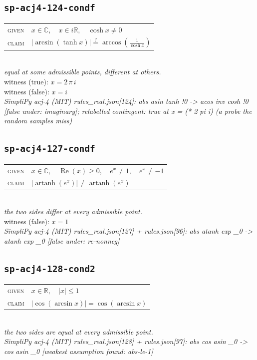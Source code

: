 \documentclass[11pt]{article}
\begin{document}
\subsection*{\texttt{sp-acj4-124-condf}}
\begin{tabular}{@{}l@{\quad}l@{}}
\textsc{given} & $x \in \mathbb{C},\quad x \in i\mathbb{R},\quad \cosh x \neq 0$ \\[4pt]
\textsc{claim} & $\displaystyle \left|\arcsin\left(\tanh x\right)\right| \overset{?}{=} \arccos\left(\frac{1}{\cosh x}\right)$ \\
\end{tabular}\\[2pt]
{\small\emph{equal at some admissible points, different at others.}}\\
{\footnotesize\color{gray}witness (true): $x = 2 \, \pi \, i$}\\
{\footnotesize\color{gray}witness (false): $x = i$}\\
\emph{SimpliPy acj-4 (MIT) rules\_real.json[124]: abs asin tanh !0  ->  acos inv cosh !0  [false under: imaginary]; relabelled contingent: true at x = (* 2 pi i) (a probe the random samples miss)}\\

\subsection*{\texttt{sp-acj4-127-condf}}
\begin{tabular}{@{}l@{\quad}l@{}}
\textsc{given} & $x \in \mathbb{C},\quad \operatorname{Re}\left(x\right) \ge 0,\quad e^{x} \neq 1,\quad e^{x} \neq -1$ \\[4pt]
\textsc{claim} & $\displaystyle \left|\operatorname{artanh}\left(e^{x}\right)\right| \neq \operatorname{artanh}\left(e^{x}\right)$ \\
\end{tabular}\\[2pt]
{\small\emph{the two sides differ at every admissible point.}}\\
{\footnotesize\color{gray}witness (false): $x = 1$}\\
\emph{SimpliPy acj-4 (MIT) rules\_real.json[127] + rules.json[96]: abs atanh exp \_0  ->  atanh exp \_0  [false under: re-nonneg]}\\

\subsection*{\texttt{sp-acj4-128-cond2}}
\begin{tabular}{@{}l@{\quad}l@{}}
\textsc{given} & $x \in \mathbb{R},\quad \left|x\right| \le 1$ \\[4pt]
\textsc{claim} & $\displaystyle \left|\cos\left(\arcsin x\right)\right| = \cos\left(\arcsin x\right)$ \\
\end{tabular}\\[2pt]
{\small\emph{the two sides are equal at every admissible point.}}\\
\emph{SimpliPy acj-4 (MIT) rules\_real.json[128] + rules.json[97]: abs cos asin \_0  ->  cos asin \_0  [weakest assumption found: abs-le-1]}\\
\end{document}
